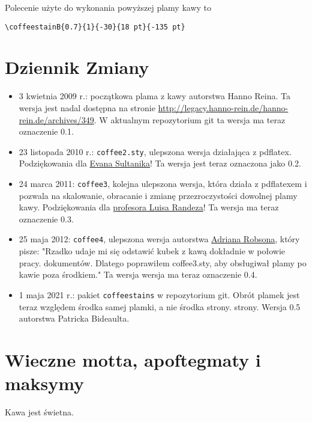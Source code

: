 \documentclass[a4paper, 11pt, BCOR = 0 pt, DIV = 11, oneside]{scrartcl}
\begin{document}
\vfill{}

\begin{tcolorbox}
  Polecenie użyte do wykonania powyższej plamy kawy to

  \verb|\coffeestainB{0.7}{1}{-30}{18 pt}{-135 pt}|
\end{tcolorbox}
\newpage{}
\section{Dziennik Zmiany}
\begin{itemize}
\item 3 kwietnia 2009 r.: początkowa plama z kawy autorstwa Hanno Reina. Ta
  wersja jest nadal dostępna na stronie
  \url{http://legacy.hanno-rein.de/hanno-rein.de/archives/349}. W aktualnym
  repozytorium git ta wersja ma teraz oznaczenie 0.1.
\item 23 listopada 2010 r.: \texttt{coffee2.sty}, ulepszona wersja działająca
  z pdflatex. Podziękowania dla \href{http://www.sultanik.com/}{Evana
    Sultanika}! Ta wersja jest teraz oznaczona jako 0.2.
\item 24 marca 2011: \texttt{coffee3}, kolejna ulepszona wersja, która działa
  z pdflatexem i pozwala na skalowanie, obracanie i zmianę przezroczystości
  dowolnej plamy kawy. Podziękowania dla
  \href{http://pcmap.unizar.es/~pilar/}{profesora Luisa Randeza}! Ta wersja ma
  teraz oznaczenie 0.3.
\item 25 maja 2012: \texttt{coffee4}, ulepszona wersja autorstwa
  \href{http://nepsweb.co.uk/homeapr/}{Adriana Robsona}, który pisze: "Rzadko
  udaje mi się odstawić kubek z kawą dokładnie w połowie
  pracy. dokumentów. Dlatego poprawiłem coffee3.sty, aby obsługiwał plamy po
  kawie poza środkiem." Ta wersja wersja ma teraz oznaczenie 0.4.
\item 1 maja 2021 r.: pakiet \texttt{coffeestains} w repozytorium git. Obrót plamek jest
  teraz względem środka samej plamki, a nie środka strony. strony. Wersja 0.5
  autorstwa Patricka Bideaulta.
\end{itemize}
\label{stainC}

\section{Wieczne motta, apoftegmaty i maksymy}

Kawa jest świetna.

\vspace{5mm}
\end{document}
